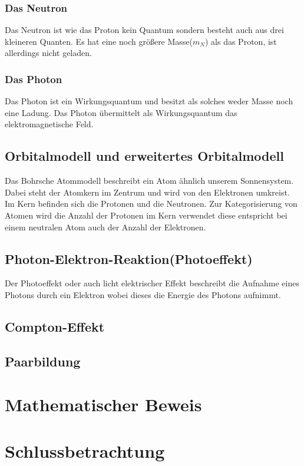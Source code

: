 \documentclass[11pt,a4paper,oneside]{report}
\begin{document}
\subsection{Das Neutron}
Das Neutron ist wie das Proton kein Quantum sondern besteht auch aus drei kleineren Quanten. Es hat eine noch größere Masse($m_N$) als das Proton, ist allerdings nicht geladen.

\subsection{Das Photon}
Das Photon ist ein Wirkungsquantum und besitzt als solches weder Masse noch eine Ladung. Das Photon übermittelt als Wirkungsquantum das elektromagnetische Feld.

\section{Orbitalmodell und erweitertes Orbitalmodell}
Das Bohrsche Atommodell beschreibt ein Atom ähnlich unserem Sonnensystem. Dabei steht der Atomkern im Zentrum und wird von den Elektronen umkreist. Im Kern befinden sich die Protonen und die Neutronen. Zur Kategorisierung von Atomen wird die Anzahl der Protonen im Kern verwendet diese entspricht bei einem neutralen Atom auch der Anzahl der Elektronen.\cite{hefterCh}

\section{Photon-Elektron-Reaktion(Photoeffekt)}
Der Photoeffekt oder auch licht elektrischer Effekt beschreibt die Aufnahme eines Photons durch ein Elektron wobei dieses die Energie des Photons aufnimmt.\cite{stroppe08}

\section{Compton-Effekt}

\section{Paarbildung}

\chapter{Mathematischer Beweis}

\chapter{Schlussbetrachtung}

\clearpage

\pagestyle{empty}


\listoftables


\end{document}
